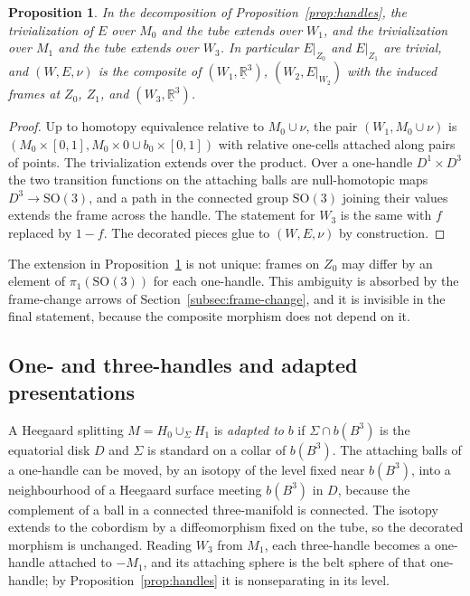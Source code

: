 \documentclass[11pt]{amsart}
\newtheorem{proposition}[theorem]{Proposition}
\theoremstyle{definition}
\theoremstyle{remark}
\theoremstyle{plain}
\numberwithin{equation}{section}
\newcommand{\RR}{\mathbb{R}}
\newcommand{\SO}{\mathrm{SO}}
\begin{document}
\begin{proposition}\label{prop:outer-bundles}
In the decomposition of Proposition~\ref{prop:handles}, the
trivialization of $E$ over $M_0$ and the tube extends over $W_1$, and
the trivialization over $M_1$ and the tube extends over $W_3$. In
particular $E|_{Z_0}$ and $E|_{Z_1}$ are trivial, and $(W,E,\nu)$ is
the composite of $(W_1,\underline{\RR}^3)$, $(W_2,E|_{W_2})$ with the
induced frames at $Z_0$, $Z_1$, and $(W_3,\underline{\RR}^3)$.
\end{proposition}

\begin{proof}
Up to homotopy equivalence relative to $M_0\cup\nu$, the pair
$(W_1,M_0\cup\nu)$ is $(M_0\times[0,1],M_0\times0\cup b_0\times[0,1])$
with relative one-cells attached along pairs of points. The
trivialization extends over the product. Over a one-handle
$D^1\times D^3$ the two transition functions on the attaching balls are
null-homotopic maps $D^3\to\SO(3)$, and a path in the connected group
$\SO(3)$ joining their values extends the frame across the handle. The
statement for $W_3$ is the same with $f$ replaced by $1-f$. The
decorated pieces glue to $(W,E,\nu)$ by construction.
\end{proof}

The extension in Proposition~\ref{prop:outer-bundles} is not unique:
frames on $Z_0$ may differ by an element of $\pi_1(\SO(3))$ for each
one-handle. This ambiguity is absorbed by the frame-change arrows of
Section~\ref{subsec:frame-change}, and it is invisible in the final
statement, because the composite morphism does not depend on it.

\subsection{One- and three-handles and adapted presentations}

A Heegaard splitting $M=H_0\cup_\Sigma H_1$ is \emph{adapted to} $b$ if
$\Sigma\cap b(B^3)$ is the equatorial disk $D$ and $\Sigma$ is standard
on a collar of $b(B^3)$. The attaching balls of a one-handle can be moved,
by an isotopy of the level fixed near $b(B^3)$, into a neighbourhood of
a Heegaard surface meeting $b(B^3)$ in $D$, because the complement of a
ball in a connected three-manifold is connected. The isotopy extends to
the cobordism by a diffeomorphism fixed on the tube, so the decorated
morphism is unchanged. Reading $W_3$ from $M_1$, each three-handle
becomes a one-handle attached to $-M_1$, and its attaching sphere is the
belt sphere of that one-handle; by Proposition~\ref{prop:handles} it is
nonseparating in its level.
\end{document}
